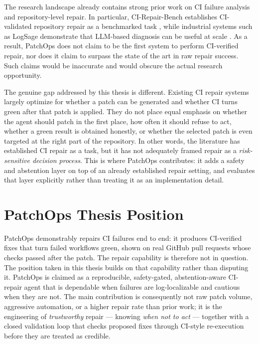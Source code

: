 The research landscape already contains strong prior work on CI failure analysis and repository-level repair.
In particular, CI-Repair-Bench establishes CI-validated repository repair as a benchmarked task
\cite{cirepairbench2026}, while industrial systems such as LogSage demonstrate that LLM-based diagnosis can be
useful at scale \cite{logsage2025}. As a result, PatchOps does not claim to be the first system to perform
CI-verified repair, nor does it claim to surpass the state of the art in raw repair success. Such claims would be
inaccurate and would obscure the actual research opportunity.

The genuine gap addressed by this thesis is different. Existing CI repair systems largely optimize for whether a
patch can be generated and whether CI turns green after that patch is applied. They do not place equal emphasis
on whether the agent should patch in the first place, how often it should refuse to act, whether a green result
is obtained honestly, or whether the selected patch is even targeted at the right part of the repository. In
other words, the literature has established CI repair as a task, but it has not adequately framed repair as a
\emph{risk-sensitive decision process}. This is where PatchOps contributes: it adds a safety and abstention
layer on top of an already established repair setting, and evaluates that layer explicitly rather than treating
it as an implementation detail.

\section{PatchOps Thesis Position}

PatchOps demonstrably repairs CI failures end to end: it produces CI-verified fixes that turn failed workflows
green, shown on real GitHub pull requests whose checks passed after the patch. The repair capability is therefore
not in question. The position taken in this thesis builds on that capability rather than disputing it. PatchOps is
claimed as a reproducible, safety-gated, abstention-aware CI-repair agent that is dependable when failures are
log-localizable and cautious when they are not. The main contribution is consequently not raw patch volume,
aggressive automation, or a higher repair rate than prior work; it is the engineering of \emph{trustworthy}
repair --- knowing \emph{when not to act} --- together with a closed validation loop that checks proposed fixes
through CI-style re-execution before they are treated as credible.

